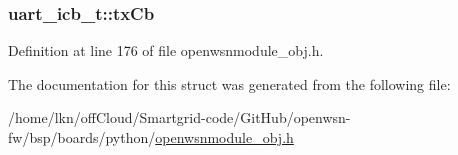 \subsubsection[{\texorpdfstring{tx\+Cb}{txCb}}]{ uart\+\_\+icb\+\_\+t\+::tx\+Cb}\hypertarget{structuart__icb__t_a57ddc50d1f6a8d5d7f59233b074b0123}{}\label{structuart__icb__t_a57ddc50d1f6a8d5d7f59233b074b0123}


Definition at line 176 of file openwsnmodule\+\_\+obj.\+h.



The documentation for this struct was generated from the following file\+:\begin{DoxyCompactItemize}
\item 
/home/lkn/off\+Cloud/\+Smartgrid-\/code/\+Git\+Hub/openwsn-\/fw/bsp/boards/python/\hyperlink{openwsnmodule__obj_8h}{openwsnmodule\+\_\+obj.\+h}\end{DoxyCompactItemize}
